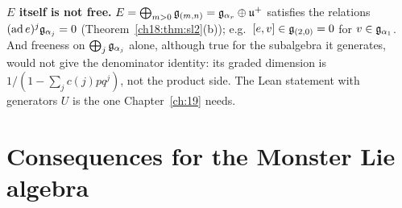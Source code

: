 \begin{warning}
\textbf{$E$ itself is not free.}  $E=\bigoplus_{m>0}\mathfrak{g}_{(m,n)}=\mathfrak{g}_{\alpha_r}\oplus\mathfrak{u}^+$ satisfies the relations $(\mathrm{ad}\,e)^j\mathfrak{g}_{\alpha_j}=0$
(Theorem~\ref{ch18:thm:sl2}(b)); e.g.\ $[e,v]\in\mathfrak{g}_{(2,0)}=0$ for $v\in\mathfrak{g}_{\alpha_1}$.  And freeness on $\bigoplus_j\mathfrak{g}_{\alpha_j}$ alone, although true for
the subalgebra it generates, would not give the denominator identity: its graded dimension is $1/(1-\sum_jc(j)pq^j)$, not the product side.  The Lean statement with generators $U$ is the one Chapter~\ref{ch:19} needs.
\end{warning}

\section{Consequences for the Monster Lie algebra}\label{ch18:sec:monsterconsequences}

